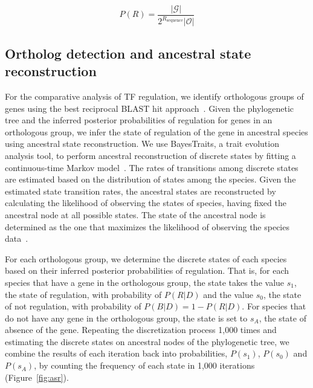 \begin{equation}
P(R) = \frac{|\mathcal{G}|}{2^{R_{\mathrm{sequence}}} |\mathcal{O}|}
\end{equation}

\subsection{Ortholog detection and ancestral state reconstruction}

For the comparative analysis of TF regulation, we identify orthologous groups
of genes using the best reciprocal BLAST hit
approach~\cite{wall2003detecting}. Given the phylogenetic tree and the inferred
posterior probabilities of regulation for genes in an orthologous group, we
infer the state of regulation of the gene in ancestral species using ancestral
state reconstruction. We use BayesTraits, a trait evolution analysis tool, to
perform ancestral reconstruction of discrete states by fitting a
continuous-time Markov model~\cite{pagel2004bayesian}. The rates of transitions
among discrete states are estimated based on the distribution of states among
the species. Given the estimated state transition rates, the ancestral states
are reconstructed by calculating the likelihood of observing the states of
species, having fixed the ancestral node at all possible states. The state of
the ancestral node is determined as the one that maximizes the likelihood of
observing the species data~\cite{pagel1997inferring, pagel1999maximum}.

For each orthologous group, we determine the discrete states of each species
based on their inferred posterior probabilities of regulation. That is, for
each species that have a gene in the orthologous group, the state takes the
value $s_1$, the state of regulation, with probability of $P(R|D)$ and the
value $s_0$, the state of not regulation, with probability of
$P(B|D)=1-P(R|D)$. For species that do not have any gene in the orthologous
group, the state is set to $s_A$, the state of absence of the gene. Repeating
the discretization process 1,000 times and estimating the discrete states on
ancestral nodes of the phylogenetic tree, we combine the results of each
iteration back into probabilities, $P(s_1)$, $P(s_0)$ and $P(s_A)$, by counting
the frequency of each state in 1,000 iterations (Figure~\ref{fig:asr}).

